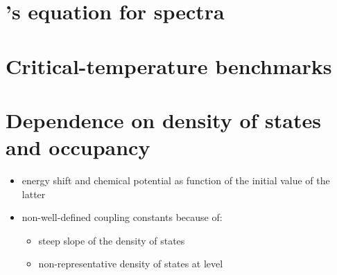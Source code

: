 \section{'s equation for  spectra}

\section{Critical-temperature benchmarks}

\section{Dependence on density of states and occupancy}

\begin{itemize}
    \item energy shift and chemical potential as function of the initial value
          of the latter
    \item non-well-defined coupling constants because of:
    \begin{itemize}
        \item steep slope of the density of states
        \item non-representative density of states at  level
    \end{itemize}
\end{itemize}
